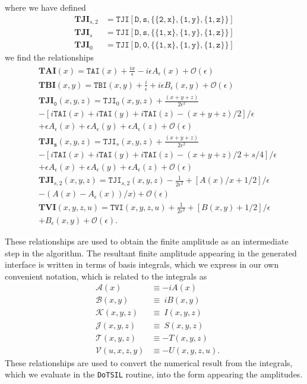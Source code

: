 where we have defined
\begin{align*}
\mathtt{\mathbf{TJI}}_{s,2}&= \mathtt{TJI[D,s,\{\{2,x\}, \{1,y\}, \{1,z\}\}]}\\
\mathtt{\mathbf{TJI}}_{s}&= \mathtt{TJI[D,s,\{\{1,x\}, \{1,y\}, \{1,z\}\}]}\\
\mathtt{\mathbf{TJI}}_{0}&= \mathtt{TJI[D,0,\{\{1,x\}, \{1,y\}, \{1,z\}\}]}
\end{align*}
we find the relationships
\begin{align*}
&\mathtt{\mathbf{TAI} }(x)= \mathtt{TAI}(x)+\frac{ix}{\epsilon} -i\epsilon A_{\epsilon}(x) + \mathcal{O}(\epsilon)\\
&\mathtt{\mathbf{TBI} }(x,y)= \mathtt{TBI}(x,y)+\frac{i}{\epsilon} + i\epsilon B_{\epsilon}(x,y) + \mathcal{O}(\epsilon)\\
&\mathtt{\mathbf{TJI}_0 }(x,y,z)= \mathtt{TJI}_0(x,y,z)+\frac{(x+y+z)}{2\epsilon^2}  \\ & -\left[i\mathtt{TAI}(x)+i\mathtt{TAI}(y)+i\mathtt{TAI}(z)-(x+y+z)/2\right]/\epsilon\\&+ \epsilon A_{\epsilon}(x)+\epsilon A_{\epsilon}(y)+\epsilon A_{\epsilon}(z) +  \mathcal{O}(\epsilon)\\
&\mathtt{\mathbf{TJI}_s }(x,y,z)= \mathtt{TJI}_s(x,y,z)+\frac{(x+y+z)}{2\epsilon^2}  \\ & -\left[i\mathtt{TAI}(x)+i\mathtt{TAI}(y)+i\mathtt{TAI}(z)-(x+y+z)/2+s/4\right]/\epsilon\\&+ \epsilon A_{\epsilon}(x)+\epsilon A_{\epsilon}(y)+\epsilon A_{\epsilon}(z) + \mathcal{O}(\epsilon)\\
&\mathtt{\mathbf{TJI}}_{s,2}(x,y,z)= \mathtt{TJI}_{s,2}(x,y,z) -\frac{1}{2\epsilon^2} +\left[A(x)/x +1/2\right]/\epsilon\\ &- (A(x)- A_{\epsilon}(x))/x)+\mathcal{O}(\epsilon) \\
&\mathtt{\mathbf{TVI}}(x,y,z,u)= \mathtt{TVI}(x,y,z,u) +\frac{1}{2\epsilon^2} +\left[B(x,y) +1/2\right]/\epsilon\\ &+ B_{\epsilon}(x,y)+\mathcal{O}(\epsilon).
\end{align*}

These relationships are used to obtain the finite amplitude as an intermediate step in the \mb algorithm.  The resultant finite amplitude appearing in the generated \tsil interface is written in terms of \tarcer basis integrals, which we express in our own convenient notation, which is related to the \tsil integrals as
\begin{eqnarray*}
&\mathcal{A}(x)      &\equiv   -i A(x)\\
&\mathcal{B}(x,y)    &\equiv   \ i B(x,y)\\
&\mathcal{K}(x,y,z) &\equiv   \ I(x,y,z)\\   
&\mathcal{J}(x,y,z)  &\equiv    \ S(x,y,z) \\
&\mathcal{T}(x,y,z)  &\equiv  - T(x,y,z)\\
&\mathcal{V}(u,x,z,y)&\equiv  - U(x,y,z,u).
\end{eqnarray*}
These relationships are used to convert the numerical result from the \tsil integrals, which we evaluate in the \lstinline{DoTSIL} routine, into the form appearing the amplitudes.



